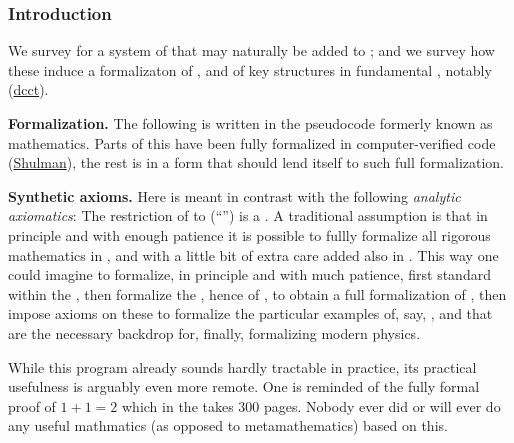 \documentclass[12pt,titlepage]{article}
\theoremstyle{plain}
\theoremstyle{definition}
\theoremstyle{remark}
\begin{document}
\hypertarget{introduction}{}\subsubsection*{{Introduction}}\label{introduction}

We survey  for a system of  that may naturally be added to ; and we survey how these induce a  formalizaton of ,  and of key structures in fundamental , notably     (\hyperlink{dcct}{dcct}).

\textbf{Formalization.} The following is written in the pseudocode formerly known as mathematics. Parts of this have been fully formalized in computer-verified code (\hyperlink{Shulman}{Shulman}), the rest is in a form that should lend itself to such full formalization.

\textbf{Synthetic axioms.} Here \emph{} is meant in contrast with the following \emph{analytic axiomatics}: The restriction of  to  (``'') is a . A traditional assumption is that in principle and with enough patience it is possible to fullly formalize all rigorous mathematics in , and with a little bit of extra care added also in . This way one could imagine to formalize, in principle and with much patience, first standard  within the , then formalize the , hence of , to obtain a full formalization of , then impose axioms on these to formalize the particular examples of, say, ,  and  that are the necessary backdrop for, finally, formalizing modern physics.

While this program already sounds hardly tractable in practice, its practical usefulness is arguably even more remote. One is reminded of the fully formal proof of $1+1 = 2$ which in the \emph{} takes 300 pages. Nobody ever did or will ever do any useful mathmatics (as opposed to metamathematics) based on this.
\end{document}
